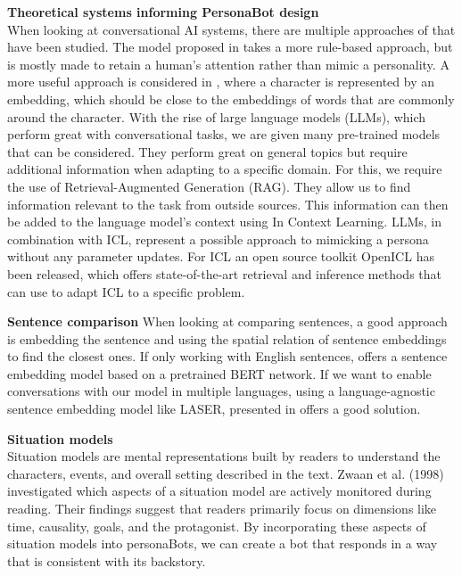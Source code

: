 \documentclass[fleqn,moreauthors,10pt]{ds_report}
\begin{document}
\textbf{Theoretical systems informing PersonaBot design} \\
When looking at conversational AI systems, there are multiple approaches of that have been studied. The model proposed in \cite{papaioannou2022designing} takes a more rule-based approach, but is mostly made to retain a human's attention rather than mimic a personality. A more useful approach is considered in \cite{li2016persona}, where a character is represented by an embedding, which should be close to the embeddings of words that are commonly around the character. With the rise of large language models (LLMs), \cite{minaee2024large} which perform great with conversational tasks, we are given many pre-trained models that can be considered. They perform great on general topics but require additional information when adapting to a specific domain. For this, we require the use of Retrieval-Augmented Generation (RAG). They allow us to find information relevant to the task from outside sources. This information can then be added to the language model's context using In Context Learning. LLMs, in combination with ICL, represent a possible approach to mimicking a persona without any parameter updates. For ICL an open source toolkit OpenICL \cite{wu2023openicl} has been released, which offers state-of-the-art retrieval and inference methods that can use to adapt ICL to a specific problem.


\textbf{Sentence comparison}
When looking at comparing sentences, a good approach is embedding the sentence and using the spatial relation of sentence embeddings to find the closest ones. If only working with English sentences, \cite{reimers-gurevych-2019-sentence} offers a sentence embedding model based on a pretrained BERT network. If we want to enable conversations with our model in multiple languages, using a language-agnostic sentence embedding model like LASER, presented in \cite{schwenk2017learning} offers a good solution.

\textbf{Situation models} \\
Situation models are mental representations built by readers to understand the characters, events, and overall setting described in the text. Zwaan et al. (1998) \cite{zwaan1998constructing} investigated which aspects of a situation model are actively monitored during reading. Their findings suggest that readers primarily focus on dimensions like time, causality, goals, and the protagonist. By incorporating these aspects of situation models into personaBots, we can create a bot that responds in a way that is consistent with its backstory.
\end{document}
